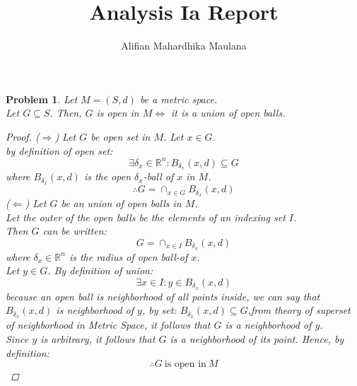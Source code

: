 \documentclass[a4paper,12pt]{article}
\title{Analysis Ia Report}
\author{Alifian Mahardhika Maulana}
\newtheorem{prob}{Problem}[]
\newcommand{\R}{\mathbb{R}}
\DeclareMathOperator*{\capmod}{\cap}
\begin{document}
\maketitle
\begin{prob}
	Let $M=(S,d)$ be a metric space.\\
	Let $G \subseteq S$. Then, $G$ is open in $M \iff$ it is a union of open balls.
	\begin{proof}
		($\Rightarrow$)
		Let $G$ be open set in $M$.
		Let $x \in G$.\\
		by definition of open set:
		\begin{equation*}
		\exists \delta_x \in \R^n : B_{\delta_x}(x,d) \subseteq G
		\end{equation*}
		where $B_{\delta_x}(x,d)$ is the open $\delta_x$-ball of $x$ in $M$.
		\begin{equation*}
		\therefore G = \capmod_{x\in G} B_{\delta_x}(x,d)
		\end{equation*}
		($\Leftarrow$) Let $G$ be an union of open balls in $M$.\\
		Let the outer of the open balls be the elements of an indexing set $I$.\\
		Then $G$ can be written:
		\begin{equation*}
		G = \capmod_{x\in I} B_{\delta_x}(x,d)
		\end{equation*}
		where $\delta_x \in \R^n$ is the radius of open ball-of $x$.\\
		Let $y\in G$. By definition of union:
		\begin{equation*}
		\exists x \in I : y \in B_{\delta_x}(x,d)
		\end{equation*}
		because an open ball is neighborhood of all points inside, we can say that $B_{\delta_x}(x,d)$ is neighborhood of $y$, by set: $B_{\delta_x}(x,d) \subseteq G$,from theory of superset of neighborhood in Metric Space, it follows that $G$ is a neighborhood of $y$.\\
		Since $y$ is arbitrary, it follows that $G$ is a neighborhood of its point. Hence, by definition:
		\begin{equation*}
		\therefore G\ \text{is open in}\ M
		\end{equation*}
	\end{proof}
\end{prob}
\newpage
\end{document}
